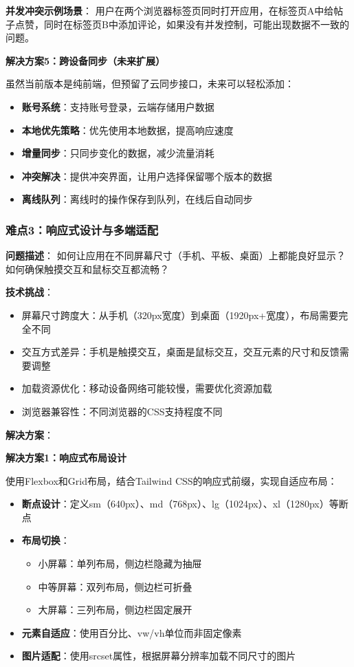 \documentclass[12pt,a4paper]{article}
\begin{document}
\textbf{并发冲突示例场景}：
用户在两个浏览器标签页同时打开应用，在标签页A中给帖子点赞，同时在标签页B中添加评论，如果没有并发控制，可能出现数据不一致的问题。

\textbf{解决方案5：跨设备同步（未来扩展）}

虽然当前版本是纯前端，但预留了云同步接口，未来可以轻松添加：

\begin{itemize}
    \item \textbf{账号系统}：支持账号登录，云端存储用户数据
    \item \textbf{本地优先策略}：优先使用本地数据，提高响应速度
    \item \textbf{增量同步}：只同步变化的数据，减少流量消耗
    \item \textbf{冲突解决}：提供冲突界面，让用户选择保留哪个版本的数据
    \item \textbf{离线队列}：离线时的操作保存到队列，在线后自动同步
\end{itemize}

\subsubsection{难点3：响应式设计与多端适配}

\textbf{问题描述}：
如何让应用在不同屏幕尺寸（手机、平板、桌面）上都能良好显示？如何确保触摸交互和鼠标交互都流畅？

\textbf{技术挑战}：
\begin{itemize}
    \item 屏幕尺寸跨度大：从手机（320px宽度）到桌面（1920px+宽度），布局需要完全不同
    \item 交互方式差异：手机是触摸交互，桌面是鼠标交互，交互元素的尺寸和反馈需要调整
    \item 加载资源优化：移动设备网络可能较慢，需要优化资源加载
    \item 浏览器兼容性：不同浏览器的CSS支持程度不同
\end{itemize}

\textbf{解决方案}：

\textbf{解决方案1：响应式布局设计}

使用Flexbox和Grid布局，结合Tailwind CSS的响应式前缀，实现自适应布局：

\begin{itemize}
    \item \textbf{断点设计}：定义sm（640px）、md（768px）、lg（1024px）、xl（1280px）等断点
    \item \textbf{布局切换}：
        \begin{itemize}
            \item 小屏幕：单列布局，侧边栏隐藏为抽屉
            \item 中等屏幕：双列布局，侧边栏可折叠
            \item 大屏幕：三列布局，侧边栏固定展开
        \end{itemize}
    \item \textbf{元素自适应}：使用百分比、vw/vh单位而非固定像素
    \item \textbf{图片适配}：使用srcset属性，根据屏幕分辨率加载不同尺寸的图片
\end{itemize}
\end{document}
